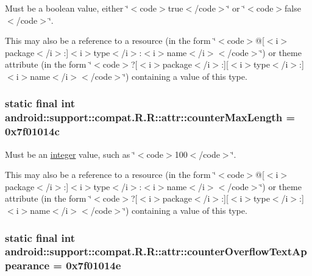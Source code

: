 Must be a boolean value, either \char`\"{}$<$code$>$true$<$/code$>$\char`\"{} or \char`\"{}$<$code$>$false$<$/code$>$\char`\"{}. 

This may also be a reference to a resource (in the form \char`\"{}$<$code$>$@\mbox{[}$<$i$>$package$<$/i$>$:\mbox{]}$<$i$>$type$<$/i$>$:$<$i$>$name$<$/i$>$$<$/code$>$\char`\"{}) or theme attribute (in the form \char`\"{}$<$code$>$?\mbox{[}$<$i$>$package$<$/i$>$:\mbox{]}\mbox{[}$<$i$>$type$<$/i$>$:\mbox{]}$<$i$>$name$<$/i$>$$<$/code$>$\char`\"{}) containing a value of this type. \hypertarget{classandroid_1_1support_1_1compat_1_1_r_1_1attr_1f253d4dc22a40df5acac148ba40d0db}{
\subsubsection[{counterMaxLength}]{\setlength{\rightskip}{0pt plus 5cm}static final int android::support::compat.R.R::attr::counterMaxLength = 0x7f01014c}}
\label{classandroid_1_1support_1_1compat_1_1_r_1_1attr_1f253d4dc22a40df5acac148ba40d0db}


Must be an \hyperlink{classandroid_1_1support_1_1compat_1_1_r_1_1integer}{integer} value, such as \char`\"{}$<$code$>$100$<$/code$>$\char`\"{}. 

This may also be a reference to a resource (in the form \char`\"{}$<$code$>$@\mbox{[}$<$i$>$package$<$/i$>$:\mbox{]}$<$i$>$type$<$/i$>$:$<$i$>$name$<$/i$>$$<$/code$>$\char`\"{}) or theme attribute (in the form \char`\"{}$<$code$>$?\mbox{[}$<$i$>$package$<$/i$>$:\mbox{]}\mbox{[}$<$i$>$type$<$/i$>$:\mbox{]}$<$i$>$name$<$/i$>$$<$/code$>$\char`\"{}) containing a value of this type. \hypertarget{classandroid_1_1support_1_1compat_1_1_r_1_1attr_66ef474bdaf5e4fa45c4085de1304c74}{
\subsubsection[{counterOverflowTextAppearance}]{\setlength{\rightskip}{0pt plus 5cm}static final int android::support::compat.R.R::attr::counterOverflowTextAppearance = 0x7f01014e}}
\label{classandroid_1_1support_1_1compat_1_1_r_1_1attr_66ef474bdaf5e4fa45c4085de1304c74}


